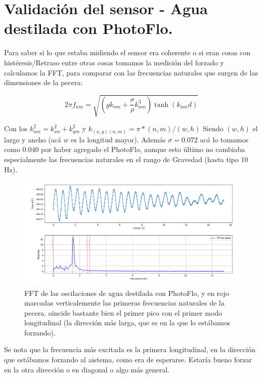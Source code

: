 \section{Validación del sensor - Agua destilada con PhotoFlo.}
Para saber si lo que estaba midiendo el sensor era coherente o si eran cosas con histéresis/Retraso entre otras cosas tomamos la medición del forzado y calculamos la FFT, para comparar con las frecuencias naturales que surgen de las dimensiones de la pecera:

\begin{equation}
	2\pi f_{nm} = \sqrt{\left(gk_{nm}+\frac{\sigma}{\rho}k_{nm}^3\right)\tanh(k_{nm}d)}
\end{equation}

Con los $k_{nm}^2=k_{xn}^2+k_{ym}^2$ y $k_{(x,y)(n,m)} = \pi*(n,m)/(w,h)$ Siendo $(w,h)$ el largo y ancho (acá $w$ es la longitud mayor). Además $\sigma=0.072$ acá lo tomamos como $0.040$ por haber agregado el PhotoFlo, aunque esto último no cambiaba especialmente las frecuencias naturales en el rango de Gravedad (hasta tipo 10 Hz). %

\begin{figure}[!ht]
	\centering
	\includegraphics[width=0.87\linewidth]{Figures/19_05_2025/Caracterización_validación_con_PhotoFlo}
	\caption{FFT de las oscilaciones de agua destilada con PhotoFlo, y en rojo marcadas verticalemente las primeras frecuencias naturales de la pecera. oincide bastante bien el primer pico con el primer modo longitudinal (la dirección más larga, que es en la que lo estábamos forzando).}
	\label{fig:caracterizacionvalidacionconphotoflo}
\end{figure}

Se nota que la frecuencia más excitada es la primera longitudinal, en la dirección que estábamos forzando al aistema, como era de esperarse. Estaría bueno forzar en la otra dirección o en diagonal o algo más general.



